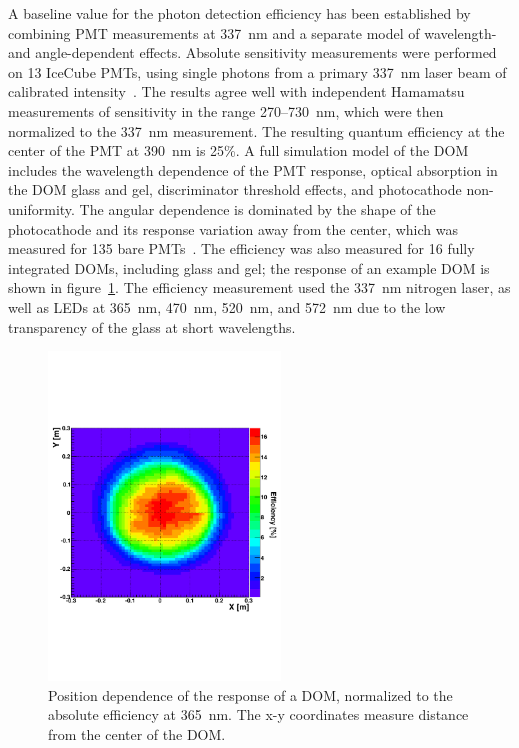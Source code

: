 A baseline value for the photon detection efficiency has been established
by combining PMT measurements at 337~nm and a separate model of wavelength-
and angle-dependent effects.  Absolute sensitivity measurements were
performed on 13 IceCube PMTs, using single photons from a primary 337~nm laser beam of calibrated
intensity~\cite{ICECUBE:PMT}. The results agree well with independent
Hamamatsu measurements of sensitivity in the range 270--730~nm, which
were then normalized to the 337~nm measurement.  The resulting quantum
efficiency at the center of the PMT at 390~nm is 25\%.  A full
simulation model of the DOM includes the wavelength dependence of the PMT
response, optical absorption in the DOM glass and gel, discriminator
threshold effects, and photocathode non-uniformity.  The angular dependence is
dominated by the shape of the photocathode and its response variation away
from the center, which was measured for 135 bare
PMTs~\cite{ICECUBE:PMT}. The efficiency was also measured for 16 fully integrated
DOMs, including glass and gel; the response of an example DOM is shown
in figure~\ref{fig:goldendom}. The efficiency measurement used the
337~nm nitrogen laser, as well as LEDs at 365~nm, 470~nm, 520~nm, and
572~nm due to the low transparency of the glass at short wavelengths.

\begin{figure}[!h]
 \centering
 \includegraphics[width=0.55\textwidth]{graphics/dom/performance/GDOM-NemuriNeko-2D-colz.pdf}
 \caption{Position dependence of the response of a DOM, normalized to
   the absolute efficiency at 365~nm. The x-y coordinates measure
   distance from the center of the DOM.}
 \label{fig:goldendom}
\end{figure}

